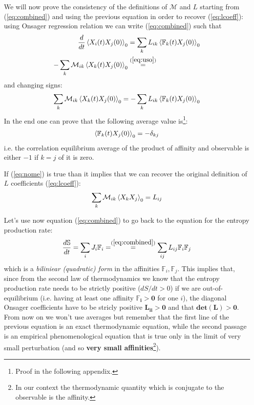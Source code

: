 \documentclass[\main/main.tex]{subfiles}
\begin{document}
We will now prove the consistency of the definitions of $\mathcal{M}$ and $L$ starting from (\ref{eq:combined}) and using the previous equation in order to recover (\ref{eq:lcoeff}): using Onsager regression relation we can write (\ref{eq:combined}) such that
\begin{align}
    \frac{d}{dt}\left\langle X_i(t)X_j(0) \right\rangle_0 &=\sum_kL_{ik}\left\langle \mathbb{F}_k(t)X_j(0) \right\rangle_0 \\
    -\sum_k\mathcal{M}_{ik}\left\langle X_k(t)X_j(0) \right\rangle_0 &\overset{(\ref{eq:uso})}{=} 
\end{align}
and changing signs:
\begin{equation}
    \sum_k\mathcal{M}_{ik}\left\langle X_k(t)X_j(0) \right\rangle_0   =-\sum_kL_{ik}\left\langle \mathbb{F}_k(t)X_j(0) \right\rangle_0    
\end{equation}
In the end one can prove that the following average value is\footnote{Proof in the following appendix.}:
\begin{equation}
    \left\langle \mathbb{F}_k(t)X_j(0) \right\rangle_0=-\delta_{kj}
    \label{eq:nome}
\end{equation}
i.e. the correlation equilibrium average of the product of affinity and observable is either $-1$ if $k=j$ of it is zero.

If (\ref{eq:nome}) is true than it implies that we can recover the original definition of $L$ coefficients (\ref{eq:lcoeff}):
\begin{equation}
    \sum_k\mathcal{M}_{ik}\left\langle X_kX_j \right\rangle_0=L_{ij}
\end{equation}

Let's use now equation (\ref{eq:combined}) to go back to the equation for the entropy production rate:
\begin{equation}
    \frac{d \mathbb{S}}{d t}=\sum_iJ_i\mathbb{F}_i=\overset{(\ref{eq:combined})}{=}\sum_{i j} L_{i j} \mathbb{F}_{i} \mathbb{F}_{j}
\end{equation}
which is a \textit{biliniear (quadratic) form} in the affinities $\mathbb{F}_i,\mathbb{F}_j$. This implies that, since from the second law of thermodynamics we know that the entropy production rate needs to be strictly positive ($dS/dt>0$) if we are out-of-equilibrium (i.e. having at least one affinity $\mathbf{\mathbb{F}_i>0}$ for one $i$), the diagonal Onsager coefficients have to be stricly positive $\mathbf{L_{ii}>0}$ and that $\mathbf{det(L)>0}$. \\

From now on we won't use averages but remember that the first line of the previous equation is an exact thermodynamic equation, while the second passage is an empirical phenomenological equation that is true only in the limit of very small perturbation (and so \textbf{very small affinities}\footnote{In our context the thermodynamic quantity which is conjugate to the observable is the affinity.}). \\
\end{document}
